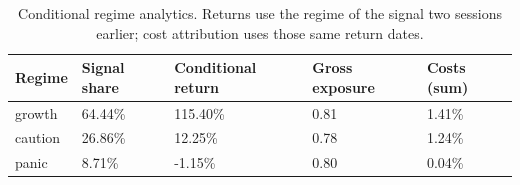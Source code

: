 \begin{table}[htbp]
\caption{Conditional regime analytics. Returns use the regime of the signal two sessions earlier; cost attribution uses those same return dates.}
\label{tab:regime}
\begin{tabular}{lllll}
\toprule
Regime & Signal share & Conditional return & Gross exposure & Costs (sum) \\
\midrule
growth & 64.44\% & 115.40\% & 0.81 & 1.41\% \\
caution & 26.86\% & 12.25\% & 0.78 & 1.24\% \\
panic & 8.71\% & -1.15\% & 0.80 & 0.04\% \\
\bottomrule
\end{tabular}
\end{table}
